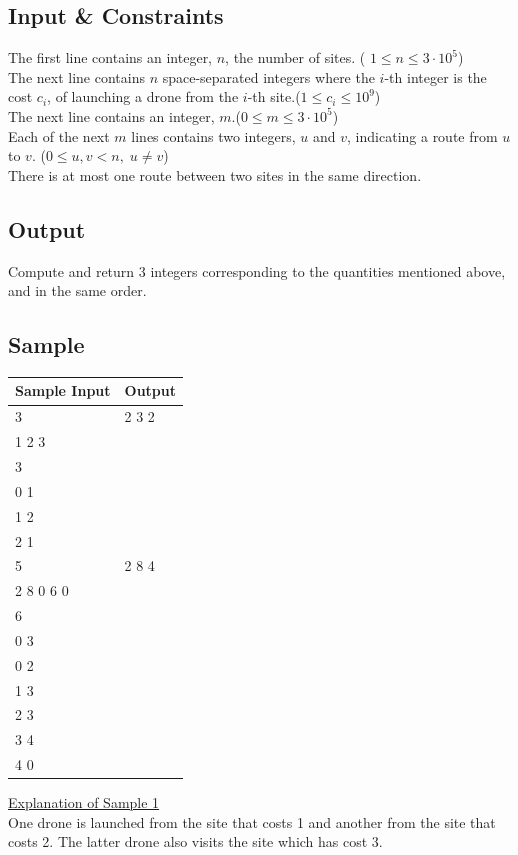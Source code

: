 \documentclass[a4paper]{exam}
\begin{document}
\begin{questions}
  \subsection*{Input \& Constraints}
  The first line contains an integer, $n$, the number of sites. ( $1\leq n\leq 3\cdot 10^5$)\\
  The next line contains $n$ space-separated integers where the $i$-th integer is the cost $c_i$, of launching a drone from the $i$-th site.($1\leq c_i\leq 10^9$) \\
  The next line contains an integer, $m$.($0\leq m\leq 3\cdot 10^5$) \\
  Each of the next $m$ lines contains two integers, $u$ and $v$, indicating a route from $u$ to $v$. ($0\leq u,v<n,\; u\neq v$)\\
  There is at most one route between two sites in the same direction.
  
  \subsection*{Output}
  Compute and return 3 integers corresponding to the quantities mentioned above, and in the same order.

  \subsection*{Sample}

  \begin{minipage}[t]{.3\textwidth}
    \begin{tabular}[t]{|l|l|}
      \hline
      Sample Input & Output\\
      \hline
      3 & 2 3 2\\
      1 2 3 & \\
      3 & \\
      0 1 & \\
      1 2 & \\
      2 1 & \\
      \hline
      5 & 2 8 4 \\
      2 8 0 6 0 & \\
      6 & \\
      0 3 & \\
      0 2 & \\
      1 3 & \\
      2 3 & \\
      3 4 & \\
      4 0 & \\
      \hline
    \end{tabular}
  \end{minipage}
  \begin{minipage}[t]{.65\textwidth}
    \vspace{10pt}
    \underline{Explanation of Sample 1}\\
    One drone is launched from the site that costs 1 and another from the site that costs 2. The latter drone also visits the site which has cost 3.
  \end{minipage}


\end{questions}
\end{document}
